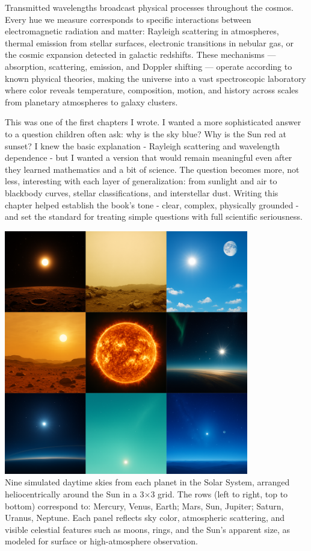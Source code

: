 Transmitted wavelengths broadcast physical processes throughout the cosmos. Every hue we measure corresponds to specific interactions between electromagnetic radiation and matter: Rayleigh scattering in atmospheres, thermal emission from stellar surfaces, electronic transitions in nebular gas, or the cosmic expansion detected in galactic redshifts. These mechanisms — absorption, scattering, emission, and Doppler shifting — operate according to known physical theories, making the universe into a vast spectroscopic laboratory where color reveals temperature, composition, motion, and history across scales from planetary atmospheres to galaxy clusters.

\newpage

\begin{commentary}
This was one of the first chapters I wrote. I wanted a more sophisticated answer to a question children often ask: why is the sky blue? Why is the Sun red at sunset? I knew the basic explanation - Rayleigh scattering and wavelength dependence - but I wanted a version that would remain meaningful even after they learned mathematics and a bit of science. The question becomes more, not less, interesting with each layer of generalization: from sunlight and air to blackbody curves, stellar classifications, and interstellar dust. Writing this chapter helped establish the book's tone - clear, complex, physically grounded - and set the standard for treating simple questions with full scientific seriousness.
\end{commentary}


\begin{center}
    \includegraphics[width=0.8\textwidth]{27_PlanetarySkyColors/SKIES1.png}\\
    {Nine simulated daytime skies from each planet in the Solar System, arranged heliocentrically around the Sun in a 3$\times$3 grid. The rows (left to right, top to bottom) correspond to: Mercury, Venus, Earth; Mars, Sun, Jupiter; Saturn, Uranus, Neptune. Each panel reflects sky color, atmospheric scattering, and visible celestial features such as moons, rings, and the Sun's apparent size, as modeled for surface or high-atmosphere observation.
    }   
\end{center}